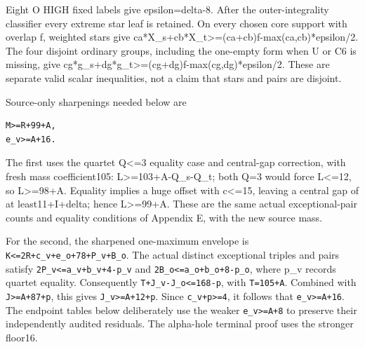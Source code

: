 \documentclass[10pt,a4paper]{article}
\theoremstyle{definition}
\begin{document}
Eight O HIGH fixed labels give epsilon=\allowbreak{}delta-8. After the
outer-integrality classifier every extreme star leaf is retained. On
every chosen core support with overlap f,\allowbreak{} weighted stars give
ca*X\_\allowbreak{}s+\allowbreak{}cb*X\_\allowbreak{}t\textgreater=\allowbreak{}(ca+\allowbreak{}cb)f-max(ca,\allowbreak{}cb)*epsilon/2. The four
disjoint ordinary groups,\allowbreak{} including the one-empty form when U or C6 is
missing,\allowbreak{} give cg*g\_\allowbreak{}s+\allowbreak{}dg*g\_\allowbreak{}t\textgreater=\allowbreak{}(cg+\allowbreak{}dg)f-max(cg,\allowbreak{}dg)*epsilon/2.
These are separate valid scalar inequalities,\allowbreak{} not a claim that stars and
pairs are disjoint.

Source-only sharpenings needed below are

\begin{lstlisting}
M>=R+99+A,
e_v>=A+16.
\end{lstlisting}

The first uses the quartet Q\textless=\allowbreak{}3 equality case and central-gap
correction,\allowbreak{} with fresh mass coefficient105:
L\textgreater=\allowbreak{}103+\allowbreak{}A-Q\_\allowbreak{}s-Q\_\allowbreak{}t; both Q=\allowbreak{}3 would force L\textless=\allowbreak{}12,\allowbreak{} so
L\textgreater=\allowbreak{}98+\allowbreak{}A. Equality implies a huge offset with c\textless=\allowbreak{}15,\allowbreak{}
leaving a central gap of at least11+\allowbreak{}I+\allowbreak{}delta; hence L\textgreater=\allowbreak{}99+\allowbreak{}A.
These are the same actual exceptional-pair counts and equality
conditions of Appendix E,\allowbreak{} with the new source mass.

For the second,\allowbreak{} the sharpened one-maximum envelope is
\texttt{K<=\allowbreak{}2R+\allowbreak{}c\_\allowbreak{}\allowbreak{}v+\allowbreak{}e\_\allowbreak{}\allowbreak{}o+\allowbreak{}78+\allowbreak{}P\_\allowbreak{}\allowbreak{}v+\allowbreak{}B\_\allowbreak{}\allowbreak{}o}. The actual
distinct exceptional triples and pairs satisfy
\texttt{2P\_\allowbreak{}\allowbreak{}v<=\allowbreak{}a\_\allowbreak{}\allowbreak{}v+\allowbreak{}b\_\allowbreak{}\allowbreak{}v+\allowbreak{}4-p\_\allowbreak{}\allowbreak{}v} and
\texttt{2B\_\allowbreak{}\allowbreak{}o<=\allowbreak{}a\_\allowbreak{}\allowbreak{}o+\allowbreak{}b\_\allowbreak{}\allowbreak{}o+\allowbreak{}8-p\_\allowbreak{}\allowbreak{}o},\allowbreak{} where p\_\allowbreak{}v records
quartet equality. Consequently
\texttt{T+\allowbreak{}J\_\allowbreak{}\allowbreak{}v-J\_\allowbreak{}\allowbreak{}o<=\allowbreak{}168-p},\allowbreak{} with
\texttt{T=\allowbreak{}105+\allowbreak{}A}. Combined with
\texttt{J>=\allowbreak{}A+\allowbreak{}87+\allowbreak{}p},\allowbreak{} this gives
\texttt{J\_\allowbreak{}\allowbreak{}v>=\allowbreak{}A+\allowbreak{}12+\allowbreak{}p}. Since
\texttt{c\_\allowbreak{}\allowbreak{}v+\allowbreak{}p>=\allowbreak{}4},\allowbreak{} it follows that
\texttt{e\_\allowbreak{}\allowbreak{}v>=\allowbreak{}A+\allowbreak{}16}. The endpoint tables below
deliberately use the weaker \texttt{e\_\allowbreak{}\allowbreak{}v>=\allowbreak{}A+\allowbreak{}8} to
preserve their independently audited residuals. The alpha-hole terminal
proof uses the stronger floor16.
\end{document}
